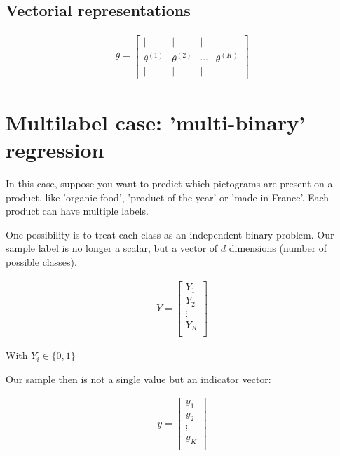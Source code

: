 \subsection{Vectorial representations}
\begin{align}
	\theta = \left[\begin{array}{cccc}| & | & | & | \\ \theta^{(1)} & \theta^{(2)} & \cdots & \theta^{(K)} \\ | & | & | & | \end{array}\right]
\end{align}












\section{Multilabel case: 'multi-binary' regression}

In this case, suppose you want to predict which pictograms are present on a product, like 'organic food', 'product of the year' or 'made in France'. Each product can have multiple labels.

One possibility is to treat each class as an independent binary problem. Our sample label is no longer a scalar, but a vector of $d$ dimensions (number of possible classes).

\begin{align}
	Y = \left[
	\begin{array}{cccc}
		Y_{1} \\
		Y_{2} \\
		\vdots\\
		Y_{K} \\
	\end{array}\right]
\end{align}

With $Y_{i} \in \{0, 1\}$

Our sample then is not a single value but an indicator vector:

\begin{align}
	y = \left[
	\begin{array}{cccc}
		y_{1} \\
		y_{2} \\
		\vdots\\
		y_{K} \\
	\end{array}\right]
\end{align}


